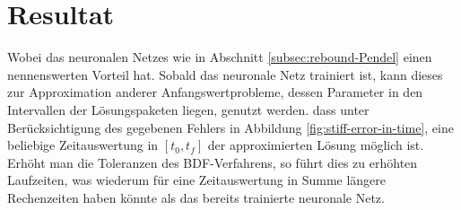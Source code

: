 \section{Resultat}
\label{sec:resultat}
Wobei das neuronalen Netzes wie in Abschnitt \ref{subsec:rebound-Pendel} einen
nennenswerten Vorteil hat. Sobald das neuronale Netz trainiert ist, kann dieses zur Approximation anderer
Anfangswertprobleme, dessen Parameter in den Intervallen der Lösungspaketen liegen, genutzt werden.
dass unter Berücksichtigung des gegebenen Fehlers in Abbildung \ref{fig:stiff-error-in-time}, eine beliebige
Zeitauswertung in $[t_0, t_f]$ der approximierten Lösung möglich ist. Erhöht man die Toleranzen des BDF-Verfahrens, so
führt dies zu erhöhten Laufzeiten, was wiederum für eine Zeitauswertung in Summe längere Rechenzeiten haben könnte als
das bereits trainierte neuronale Netz.